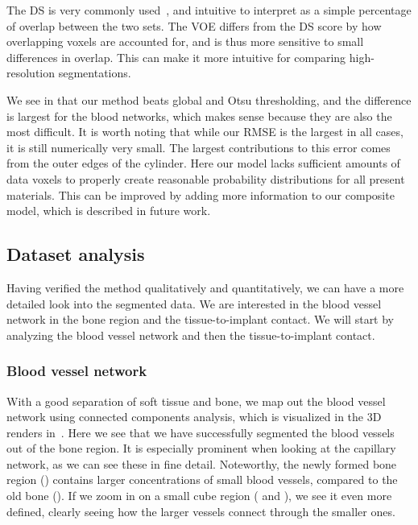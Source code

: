 The DS is very commonly used~\cite{evaluation_review}, and intuitive to
interpret as a simple percentage of overlap between the two sets. The VOE
differs from the DS score by how overlapping voxels are accounted for, and is
thus more sensitive to small differences in overlap. This can make it more
intuitive for comparing high-resolution segmentations.

We see in  that our method beats global and Otsu thresholding,
and the difference is largest for the blood networks, which makes sense because
they are also the most difficult. It is worth noting that while our RMSE is the
largest in all cases, it is still numerically very small. The largest
contributions to this error comes from the outer edges of the cylinder. Here
our model lacks sufficient amounts of data voxels to properly create reasonable
probability distributions for all present materials. This can be improved by
adding more information to our composite model, which is described in future
work.


\subsection{Dataset analysis}

Having verified the method qualitatively and quantitatively, we can have a more
detailed look into the segmented data. We are interested in the blood vessel
network in the bone region and the tissue-to-implant contact. We will start by
analyzing the blood vessel network and then the tissue-to-implant contact.

\subsubsection{Blood vessel network}
\label{sec:blood-network}

With a good separation of soft tissue and bone, we map out the blood vessel
network using connected components analysis, which is visualized in the 3D
renders in~. Here we see that we have successfully
segmented the blood vessels out of the bone region. It is especially prominent
when looking at the capillary network, as we can see these in fine detail.
Noteworthy, the newly formed bone region () contains
larger concentrations of small blood vessels, compared to the old bone
(). If we zoom in on a small cube region
( and ), we see it even more
defined, clearly seeing how the larger vessels connect through the smaller
ones.

